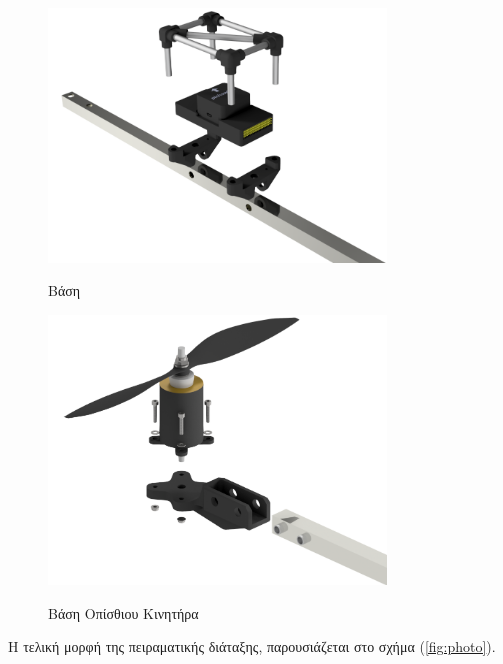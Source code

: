 \begin{figure}[H]
    \begin{minipage}[t]{0.48\textwidth}
        \centering
        \includegraphics[width=0.8\textwidth]{Skoupa/Expl_Pixhawk_Assembly_edit.png}
        \caption*{Βάση }
    \end{minipage}
    \begin{minipage}[t]{0.48\textwidth}
        \centering
        \includegraphics[width=0.8\textwidth]{Skoupa/Expl_BackMotor_edit.png}
        \caption*{Βάση Οπίσθιου Κινητήρα}
    \end{minipage}
    \caption{}\label{fig:sk_section_view}
\end{figure}

Η τελική μορφή της πειραματικής διάταξης, παρουσιάζεται στο σχήμα 
(\ref{fig:photo}).


